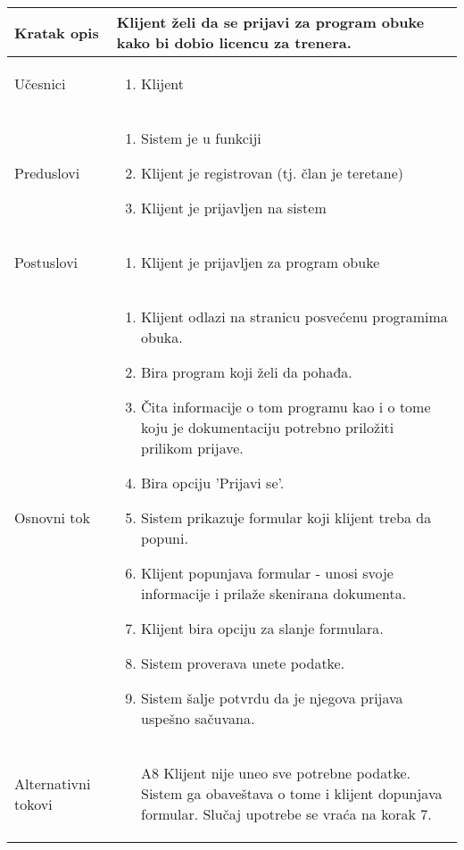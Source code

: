 \documentclass[../../main.tex]{subfiles}
\begin{document}
\begin{longtable}{| p{} | p{} |} 
\hline
    Kratak opis & Klijent želi da se prijavi za program obuke kako bi dobio licencu za trenera.  \\ 
\hline    
    Učesnici &
    \begin{enumerate}
        \item Klijent
    \end{enumerate}\\
\hline
   Preduslovi &
   \begin{enumerate}
        \item Sistem je u funkciji
        \item Klijent je registrovan (tj. član je teretane)
        \item Klijent je prijavljen na sistem
    \end{enumerate}\\
\hline  
    Postuslovi & 
    \begin{enumerate}
        \item Klijent je prijavljen za program obuke
    \end{enumerate} \\
\hline
    Osnovni tok & 
    \begin{enumerate}
        \item Klijent odlazi na stranicu posvećenu programima obuka.
        \item Bira program koji želi da pohađa.
        \item Čita informacije o tom programu kao i o tome koju je dokumentaciju potrebno priložiti prilikom prijave.
        \item Bira opciju 'Prijavi se'.
        \item Sistem prikazuje formular koji klijent treba da popuni.
        \item Klijent popunjava formular - unosi svoje informacije i prilaže skenirana dokumenta.
        \item Klijent bira opciju za slanje formulara.
        \item Sistem proverava unete podatke.
        \item Sistem šalje potvrdu da je njegova prijava uspešno sačuvana.
    \end{enumerate}\\
\hline
    Alternativni tokovi & 
    \begin{itemize}
        \item[A8] Klijent nije uneo sve potrebne podatke. Sistem ga obaveštava o tome i klijent dopunjava formular. Slučaj upotrebe se vraća na korak 7.

\end{itemize}
\end{longtable}
\end{document}
